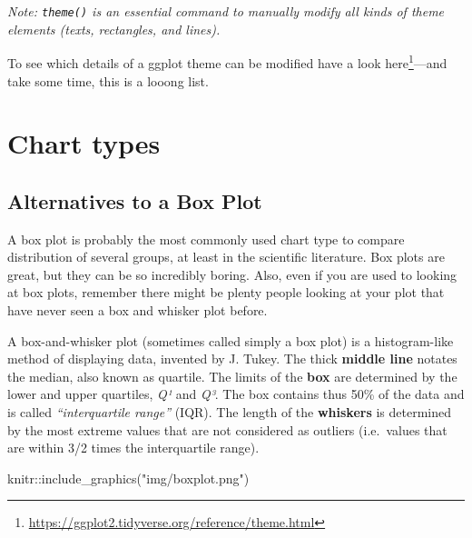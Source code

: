 \documentclass[
]{krantz}
\makeatletter
\newenvironment{Shaded}{\begin{snugshade}}{\end{snugshade}}
\newcommand{\FunctionTok}[1]{\textcolor[rgb]{0,0,0}{#1}}
\newcommand{\NormalTok}[1]{#1}
\newcommand{\SpecialCharTok}[1]{\textcolor[rgb]{0,0,0}{#1}}
\newcommand{\StringTok}[1]{\textcolor[rgb]{0.5,0.5,0.5}{#1}}
\renewcommand{\href}[2]{#2\footnote{\url{#1}}}
\newenvironment{kframe}{%
\medskip{}
\setlength{\fboxsep}{.8em}
 \def\at@end@of@kframe{}%
 \ifinner\ifhmode%
  \def\at@end@of@kframe{\end{minipage}}%
  \begin{minipage}{\columnwidth}%
 \fi\fi%
 \def\FrameCommand##1{\hskip\@totalleftmargin \hskip-\fboxsep
 \colorbox{shadecolor}{##1}\hskip-\fboxsep
     \hskip-\linewidth \hskip-\@totalleftmargin \hskip\columnwidth}%
 \MakeFramed {\advance\hsize-\width
   \@totalleftmargin\z@ \linewidth\hsize
   \@setminipage}}%
 {\par\unskip\endMakeFramed%
 \at@end@of@kframe}
\renewenvironment{Shaded}{\begin{kframe}}{\end{kframe}}
\makeatother
\begin{document}
\emph{Note: \texttt{theme()} is an essential command to manually modify all kinds of theme elements (texts, rectangles, and lines).}

To see which details of a ggplot theme can be modified have a look \href{https://ggplot2.tidyverse.org/reference/theme.html}{here}---and take some time, this is a looong list.

\hypertarget{charts}{%
\chapter{Chart types}\label{charts}}

\hypertarget{alternatives-to-a-box-plot}{%
\section{Alternatives to a Box Plot}\label{alternatives-to-a-box-plot}}

A box plot is probably the most commonly used chart type to compare distribution of several groups, at least in the scientific literature. Box plots are great, but they can be so incredibly boring. Also, even if you are used to looking at box plots, remember there might be plenty people looking at your plot that have never seen a box and whisker plot before.

A box-and-whisker plot (sometimes called simply a box plot) is a histogram-like method of displaying data, invented by J. Tukey. The thick \textbf{middle line} notates the median, also known as quartile. The limits of the \textbf{box} are determined by the lower and upper quartiles, \emph{Q¹} and \emph{Q³}. The box contains thus 50\% of the data and is called \emph{``interquartile range''} (IQR). The length of the \textbf{whiskers} is determined by the most extreme values that are not considered as outliers (i.e.~values that are within 3/2 times the interquartile range).

\begin{Shaded}
\begin{Highlighting}[]
\NormalTok{knitr}\SpecialCharTok{::}\FunctionTok{include\_graphics}\NormalTok{(}\StringTok{"img/boxplot.png"}\NormalTok{)}
\end{Highlighting}
\end{Shaded}
\end{document}
